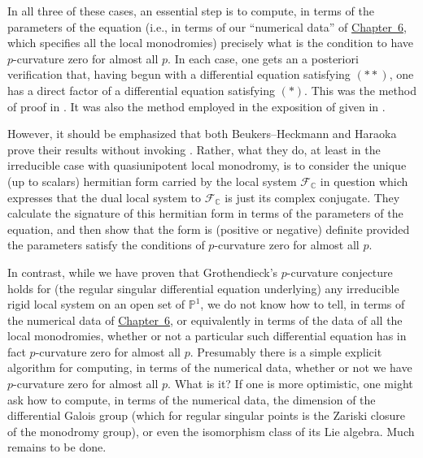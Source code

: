 In all three of these cases, an essential step is to compute, in terms of the parameters of the equation (i.e., in terms of our ``numerical data'' of \hyperref[chap:6]{Chapter~6}, which specifies all the local monodromies) precisely what is the condition to have \(p\)-curvature zero for almost all \(p\). In each case, one gets an a posteriori verification that, having begun with a differential equation satisfying \((**)\), one has a direct factor of a differential equation satisfying \((*)\). This was the method of proof in \cite[6.2]{Ka-ASDE}. It was also the method employed in the exposition of \cite{B-H} given in \cite[5.5]{Ka-ESDE}.

However, it should be emphasized that both Beukers--Heckmann and Haraoka prove their results without invoking \cite[5.7]{Ka-ASDE}. Rather, what they do, at least in the irreducible case with quasiunipotent local monodromy, is to consider the unique (up to scalars) hermitian form carried by the local system \(\mathcal{F}_{\mathbb{C}}\) in question which expresses that the dual local system to \(\mathcal{F}_{\mathbb{C}}\) is just its complex conjugate. They calculate the signature of this hermitian form in terms of the parameters of the equation, and then show that the form is (positive or negative) definite provided the parameters satisfy the conditions of \(p\)-curvature zero for almost all \(p\).

In contrast, while we have proven that Grothendieck's \(p\)-curvature conjecture holds for (the regular singular differential equation underlying) any irreducible rigid local system on an open set of \(\mathbb{P}^1\), we do not know how to tell, in terms of the numerical data of \hyperref[chap:6]{Chapter~6}, or equivalently in terms of the data of all the local monodromies, whether or not a particular such differential equation has in fact \(p\)-curvature zero for almost all \(p\). Presumably there is a simple explicit algorithm for computing, in terms of the numerical data, whether or not we have \(p\)-curvature zero for almost all \(p\). What is it? If one is more optimistic, one might ask how to compute, in terms of the numerical data, the dimension of the differential Galois group (which for regular singular points is the Zariski closure of the monodromy group), or even the isomorphism class of its Lie algebra. Much remains to be done.

